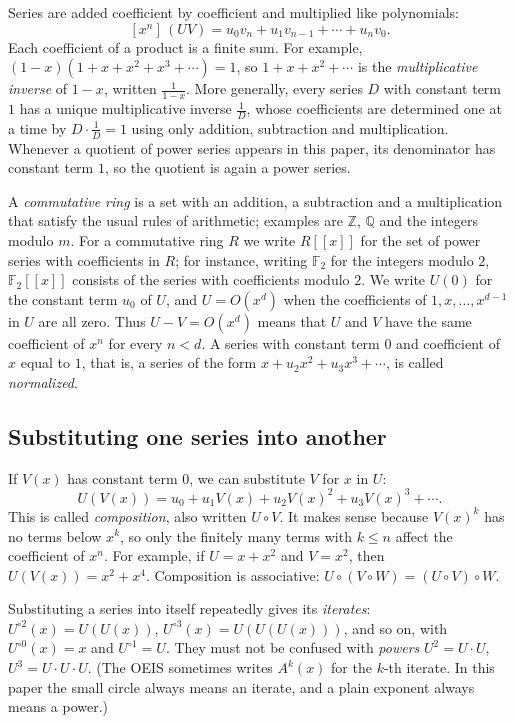 \documentclass[11pt,a4paper]{article}
\theoremstyle{definition}
\theoremstyle{remark}
\newcommand{\Z}{\mathbb{Z}}
\newcommand{\Q}{\mathbb{Q}}
\newcommand{\F}{\mathbb{F}}
\newcommand{\ps}[1]{#1[[x]]}
\newcommand{\coeff}[2]{[x^{#1}]\,#2}
\begin{document}
Series are added coefficient by coefficient and multiplied like polynomials:
\[
\coeff{n}{(UV)}=u_0v_n+u_1v_{n-1}+\cdots+u_nv_0 .
\]
Each coefficient of a product is a finite sum. For example, $(1-x)(1+x+x^2+x^3+\cdots)=1$, so $1+x+x^2+\cdots$ is
the \emph{multiplicative inverse} of $1-x$, written $\frac{1}{1-x}$. More generally, every series $D$ with constant term
$1$ has a unique multiplicative inverse $\frac1D$, whose coefficients are determined one at a time by $D\cdot\frac1D=1$
using only addition, subtraction and multiplication. Whenever a quotient of power series appears in this paper, its
denominator has constant term $1$, so the quotient is again a power series.

A \emph{commutative ring} is a set with an addition, a subtraction and a multiplication that satisfy the usual rules
of arithmetic; examples are $\Z$, $\Q$ and the integers modulo $m$. For a commutative ring $R$ we write $\ps{R}$ for
the set of power series with coefficients in $R$; for instance, writing $\F_2$ for the integers modulo $2$, $\ps{\F_2}$
consists of the series with coefficients modulo $2$. We write
$U(0)$ for the constant term $u_0$ of $U$, and $U=O(x^d)$ when the coefficients of $1,x,\dots,x^{d-1}$ in $U$ are all
zero. Thus $U-V=O(x^d)$ means that $U$ and $V$ have the same coefficient of $x^n$ for every $n<d$. A series with
constant term $0$ and coefficient of $x$ equal to $1$, that is, a series of the form $x+u_2x^2+u_3x^3+\cdots$, is
called \emph{normalized}.

\subsection{Substituting one series into another}
If $V(x)$ has constant term $0$, we can substitute $V$ for $x$ in $U$:
\[
U(V(x))=u_0+u_1V(x)+u_2V(x)^2+u_3V(x)^3+\cdots .
\]
This is called \emph{composition}, also written $U\circ V$. It makes sense because $V(x)^k$ has no terms below $x^k$,
so only the finitely many terms with $k\le n$ affect the coefficient of $x^n$. For example, if $U=x+x^2$ and $V=x^2$, then
$U(V(x))=x^2+x^4$. Composition is associative: $U\circ(V\circ W)=(U\circ V)\circ W$.

Substituting a series into itself repeatedly gives its \emph{iterates}: $U^{\circ2}(x)=U(U(x))$,
$U^{\circ3}(x)=U(U(U(x)))$, and so on, with $U^{\circ0}(x)=x$ and $U^{\circ1}=U$. They must not be confused with
\emph{powers} $U^2=U\cdot U$, $U^3=U\cdot U\cdot U$. (The OEIS sometimes writes $A^k(x)$ for the $k$-th iterate. In
this paper the small circle always means an iterate, and a plain exponent always means a power.)
\end{document}
